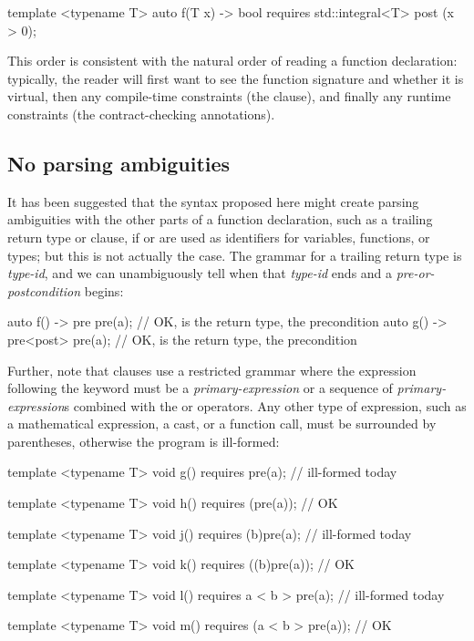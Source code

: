 \vspace{2mm}
\begin{codeblock}
template <typename T>
auto f(T x) -> bool
  requires std::integral<T>
  post (x > 0);
\end{codeblock}
\vspace{2mm}

This order is consistent with the natural order of reading a function declaration: typically, the reader will first want to see the function signature and whether it is virtual, then any compile-time constraints (the  clause), and finally any runtime constraints (the contract-checking annotations).

\subsection{No parsing ambiguities}
\label{subsec:noambig}

It has been suggested that the syntax proposed here might create parsing ambiguities with the other parts of a function declaration, such as a trailing return type or  clause, if  or  are used as identifiers for variables, functions, or types; but this is not actually the case. The grammar for a trailing return type is \tcode{->} \emph{type-id}, and we can unambiguously tell when that \emph{type-id} ends and a \emph{pre-or-postcondition} begins:

\vspace{2mm}
\begin{codeblock}
auto f() -> pre pre(a);   // OK,  is the return type,  the precondition
auto g() -> pre<post> pre(a);  // OK,  is the return type,  the precondition
\end{codeblock}
\vspace{2mm}

Further, note that  clauses use a restricted grammar where the expression following the  keyword must be a \emph{primary-expression} or a sequence of \emph{primary-expression}s combined with the \tcode{\&\&} or \tcode{||} operators. Any other type of expression, such as a mathematical expression, a cast, or a function call, must be surrounded by parentheses, otherwise the program is ill-formed:

\vspace{2mm}
\begin{codeblock}
template <typename T>
void g() requires pre(a);   // ill-formed today

template <typename T>
void h() requires (pre(a));   // OK

template <typename T>
void j() requires (b)pre(a);   // ill-formed today

template <typename T>
void k() requires ((b)pre(a));   // OK

template <typename T>
void l() requires a < b > pre(a);   // ill-formed today

template <typename T>
void m() requires (a < b > pre(a));   // OK

\end{codeblock}
\vspace{2mm}

